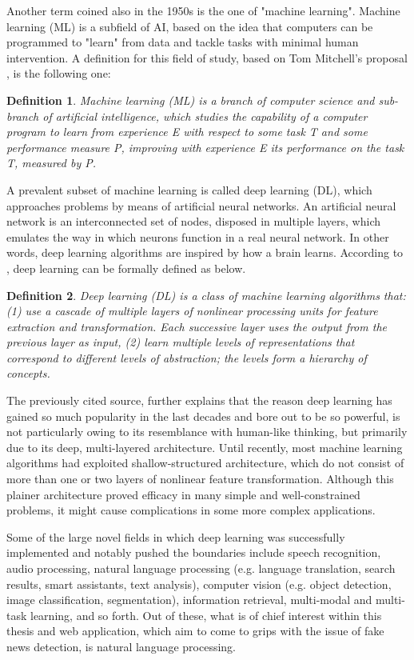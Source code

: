 \documentclass[12pt, a4paper]{article}
\newtheorem{definition}{Definition}
\begin{document}
  Another term coined also in the 1950s is the one of "machine learning". Machine learning (ML) is a subfield of AI, based on the idea that computers can be programmed to "learn" from data and tackle tasks with minimal human intervention. A definition for this field of study, based on Tom Mitchell's proposal \cite{b1}, is the following one:

  \begin{definition}
    Machine learning (ML) is a branch of computer science and sub-branch of artificial intelligence, which studies the capability of a computer program to learn from experience E with respect to some task T and some performance measure P, improving with experience E its performance on the task T, measured by P.
  \end{definition}
  
  A prevalent subset of machine learning is called deep learning (DL), which approaches problems by means of artificial neural networks. An artificial neural network is an interconnected set of nodes, disposed in multiple layers, which emulates the way in which neurons function in a real neural network. In other words, deep learning algorithms are inspired by how a brain learns. According to \cite{a7}, deep learning can be formally defined as below.

  \begin{definition}
    Deep learning (DL) is a class of machine learning algorithms that: (1) use a cascade of multiple layers of nonlinear processing units for feature extraction and transformation. Each successive layer uses the output from the previous layer as input, (2) learn multiple levels of representations that correspond to different levels of abstraction; the levels form a hierarchy of concepts.
  \end{definition}

  The previously cited source, further explains that the reason deep learning has gained so much popularity in the last decades and bore out to be so powerful, is not particularly owing to its resemblance with human-like thinking, but primarily due to its deep, multi-layered architecture. Until recently, most machine learning algorithms had exploited shallow-structured architecture, which do not consist of more than one or two layers of nonlinear feature transformation. Although this plainer architecture proved efficacy in many simple and well-constrained problems, it might cause complications in some more complex applications.

  Some of the large novel fields in which deep learning was successfully implemented and notably pushed the boundaries include speech recognition, audio processing, natural language processing (e.g. language translation, search results, smart assistants, text analysis), computer vision (e.g. object detection, image classification, segmentation), information retrieval, multi-modal and multi-task learning, and so forth. Out of these, what is of chief interest within this thesis and web application, which aim to come to grips with the issue of fake news detection, is natural language processing.
\end{document}
